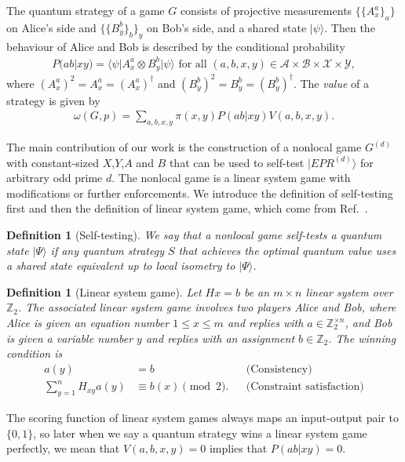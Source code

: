 \documentclass[11pt,letterpaper]{article}
\newcommand{\ket}[1]{|#1\rangle}
\newcommand{\bra}[1]{\langle#1|}
\newcommand{\x}{\otimes}
\newcommand{\Z}{\mathbb{Z}}
\newcommand{\calX}{\mathcal{X}}
\newcommand{\calY}{\mathcal{Y}}
\newcommand{\calA}{\mathcal{A}}
\newcommand{\calB}{\mathcal{B}}
\newcommand{\1}{\mathbb{1}}
\newcommand{\EPR}[1]{EPR^{(#1)}}
\newcommand{\G}[1]{G^{(#1)}}
\newcommand{\pr}[2]{P(#1|#2)}
\newtheorem{definition}[theorem]{Definition}
\theoremstyle{definition}
\begin{document}
The quantum strategy of a game $G$ consists of projective measurements $\{\{A_x^a\}_a\}$ on Alice's side and 
$\{\{B_y^b\}_b\}_y$ on Bob's side, and a shared state $\ket{\psi}$. Then the behaviour of Alice and Bob is described 
by the conditional probability
\begin{align}
	\pr{ab}{xy} = \bra{\psi} A_x^a \x B_y^b \ket{\psi} \text{ for all } (a,b,x,y) \in \calA \times \calB \times \calX \times \calY,
\end{align}
where $(A_x^a)^2 = A_x^a = (A_x^a)^\dagger$ and $(B_y^b)^2 = B_y^b = (B_y^b)^\dagger$.
The \emph{value} of a strategy is given by
\begin{align}
	\omega(G,p)  = \sum_{a,b,x,y} \pi(x,y) \pr{ab}{xy} V(a,b,x,y).
\end{align} 

The main contribution of our work is the construction of a nonlocal game $\G{d}$ with constant-sized $X$,$Y$,$A$ and $B$
that can be used to self-test $\ket{\EPR{d}}$ for arbitrary odd prime $d$. 
The nonlocal game is a linear system game with modifications or further enforcements. 
We introduce the definition of self-testing first and then the definition of linear system game, 
which come from Ref.~\cite{coladan2017, slofstra2017}.
\begin{definition}[Self-testing]
	We say that a nonlocal game self-tests a quantum state $\ket{\Psi}$ if 
	any quantum strategy $S$ that achieves the optimal quantum value uses a shared state equivalent up to local isometry to $\ket{\Psi}$.
\end{definition}
\begin{definition}[Linear system game]
 Let $Hx = b$ be an $m \times n$ linear system over $\Z_2$. The associated linear system game involves two
 players Alice and Bob, where Alice is given an equation number $1 \leq x \leq m$ and replies with $a \in \Z_2^{\times n}$,
 and Bob is given a variable number $y$ and replies with an assignment $b \in \Z_2$. The winning condition is 
 \begin{align*}
 	a(y) &= b && \text{(Consistency)} \\
	\sum_{y = 1}^n H_{xy} a(y) &\equiv b(x) \pmod 2. &&\text{(Constraint satisfaction)}
 \end{align*}
\end{definition}
The scoring function of linear system games always maps an input-output pair to $\{0,1\}$, 
so later when we say a quantum strategy wins a linear system game perfectly, we mean that 
$V(a,b,x,y) =0$ implies that $\pr{ab}{xy} = 0$.
\end{document}
